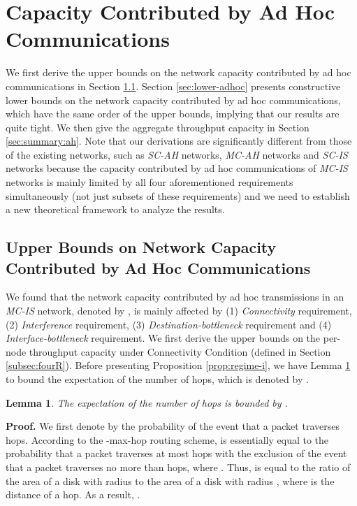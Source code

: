 \documentclass[10pt,journal]{IEEEtran}
\newtheorem{lemma}{Lemma}
\begin{document}
\section{Capacity Contributed by Ad Hoc Communications}
\label{sec:ad-hoc}
We first derive the upper bounds on the network capacity contributed by ad hoc communications in Section \ref{sec:upper-adhoc}. Section \ref{sec:lower-adhoc} presents constructive lower bounds on the network capacity contributed by ad hoc communications, which have the same order of the upper bounds, implying that our results are quite tight. We then give the aggregate throughput capacity in Section \ref{sec:summary:ah}. Note that our derivations are significantly different from those of the existing networks, such as \emph{SC-AH} networks, \emph{MC-AH} networks and \emph{SC-IS} networks because the capacity contributed by ad hoc communications of \emph{MC-IS} networks is mainly limited by all four aforementioned requirements simultaneously (not just subsets of these requirements) and we need to establish a new theoretical framework to analyze the results. 

\subsection{Upper Bounds on Network Capacity Contributed by Ad Hoc Communications}
\label{sec:upper-adhoc}

We found that the network capacity contributed by ad hoc transmissions in an \textit{MC-IS} network, denoted by , is mainly affected by (1) \textit{Connectivity} requirement, (2) \textit{Interference} requirement, (3) \textit{Destination-bottleneck} requirement and (4) \textit{Interface-bottleneck} requirement. We first derive the upper bounds on the per-node throughput capacity under Connectivity Condition (defined in Section \ref{subsec:fourR}). Before presenting Proposition \ref{prop:regime-i}, we have Lemma \ref{lemma:H} to bound the expectation of the number of hops, which is denoted by .

\begin{lemma}
\label{lemma:H}
The expectation of the number of hops  is bounded by .
\end{lemma}
\textbf{Proof.} We first denote  by the probability of the event that a packet traverses  hops. According to the -max-hop routing scheme,  is essentially equal to the probability that a packet traverses at most  hops with the exclusion of the event that a packet traverses no more than  hops, where . Thus,  is equal to the ratio of the area of a disk with radius  to the area of a disk with radius , where  is the distance of a hop. As a result, .
\end{document}
